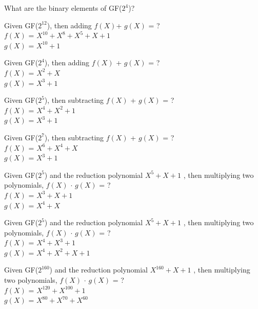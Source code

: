 \begin{exer}
What are the binary elements of GF($2^4$)?
\end{exer}
\begin{exer}
Given GF($2^{12}$), then adding $f(X)$+ $g(X)$ = ?
        \\ $f(X)$ = $X^{10} + X^8 + X^5 + X + 1$
        \\ $g(X)$ = $X^{10} + 1$
\end{exer}
\begin{exer}
Given GF($2^4$), then adding $f(X)$ + $g(X)$ = ?
        \\ $f(X)$ = $X^{2} + X $
        \\ $g(X)$ = $X^{3} + 1$
\end{exer}
\begin{exer}
Given GF($2^5$), then subtracting $f(X)$ + $g(X)$ = ?
        \\ $f(X)$ = $X^{4} + X^2 + 1 $
        \\ $g(X)$ = $X^{3} + 1$
\end{exer}
\begin{exer}
Given GF($2^7$), then subtracting $f(X)$ + $g(X)$ = ?
        \\ $f(X)$ = $X^{6} + X^4 + X $
        \\ $g(X)$ = $X^{3} + 1$
\end{exer}
\begin{exer}
Given GF($2^5$) and the reduction polynomial $X^5 + X + 1$ , then multiplying two polynomials, $f(X)$ $\cdot$ $g(X)$ = ?
        \\ $f(X)$ = $X^{3} + X + 1 $
        \\ $g(X)$ = $X^{4} + X$
\end{exer}
\begin{exer}
Given GF($2^5$) and the reduction polynomial $X^5 + X + 1$ , then multiplying two polynomials, $f(X)$ $\cdot$ $g(X)$ = ?
        \\ $f(X)$ = $X^{4} + X^3 + 1 $
        \\ $g(X)$ = $X^{4} + X^2 + X + 1$
\end{exer}
\begin{exer}
Given GF($2^{160}$) and the reduction polynomial $X^{160} + X + 1$ , then multiplying two polynomials, $f(X)$ $\cdot$ $g(X)$ = ?
        \\ $f(X)$ = $X^{120} + X^{100} + 1 $
        \\ $g(X)$ = $X^{80} + X^{70} + X^{60}$
\end{exer}

\newpage  

